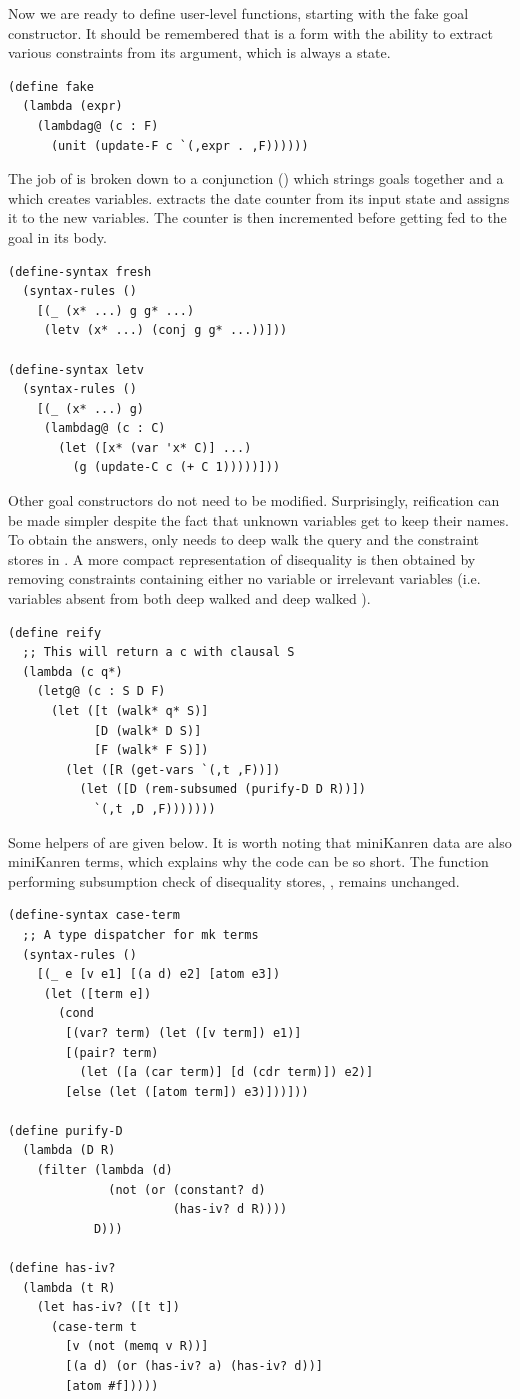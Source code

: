 Now we are ready to define user-level functions, starting with the fake goal constructor. It should be remembered that  is a  form with the ability to extract various constraints from its argument, which is always a state.
\begin{lstlisting}
(define fake
  (lambda (expr)
    (lambdag@ (c : F)
      (unit (update-F c `(,expr . ,F))))))
\end{lstlisting}

The job of  is broken down to a conjunction () which strings goals together and a  which creates variables.  extracts the date counter from its input state and assigns it to the new variables. The counter is then incremented before getting fed to the goal in its body.
\begin{lstlisting}
(define-syntax fresh
  (syntax-rules ()
    [(_ (x* ...) g g* ...)
     (letv (x* ...) (conj g g* ...))]))

(define-syntax letv
  (syntax-rules ()
    [(_ (x* ...) g)
     (lambdag@ (c : C)
       (let ([x* (var 'x* C)] ...)
         (g (update-C c (+ C 1)))))]))
\end{lstlisting}

Other goal constructors do not need to be modified. Surprisingly, reification can be made simpler despite the fact that unknown variables get to keep their names. To obtain the answers,  only needs to deep walk the query and the constraint stores in . A more compact representation of disequality is then obtained by removing constraints containing either no variable or irrelevant variables (i.e. variables absent from both deep walked  and deep walked ).
\begin{lstlisting}
(define reify
  ;; This will return a c with clausal S
  (lambda (c q*)
    (letg@ (c : S D F)
      (let ([t (walk* q* S)]
            [D (walk* D S)]
            [F (walk* F S)])
        (let ([R (get-vars `(,t ,F))])
          (let ([D (rem-subsumed (purify-D D R))])
            `(,t ,D ,F)))))))
\end{lstlisting}

Some helpers of  are given below. It is worth noting that miniKanren data are also miniKanren terms, which explains why the code can be so short. The function performing subsumption check of disequality stores, , remains unchanged.
\begin{lstlisting}
(define-syntax case-term
  ;; A type dispatcher for mk terms
  (syntax-rules ()
    [(_ e [v e1] [(a d) e2] [atom e3])
     (let ([term e])
       (cond
        [(var? term) (let ([v term]) e1)]
        [(pair? term)
          (let ([a (car term)] [d (cdr term)]) e2)]
        [else (let ([atom term]) e3)]))]))

(define purify-D
  (lambda (D R)
    (filter (lambda (d)
              (not (or (constant? d)
                       (has-iv? d R))))
            D)))

(define has-iv?
  (lambda (t R)
    (let has-iv? ([t t])
      (case-term t
        [v (not (memq v R))]
        [(a d) (or (has-iv? a) (has-iv? d))]
        [atom #f]))))
\end{lstlisting}

